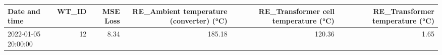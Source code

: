 \begin{tabular}{lrrrrr}
\toprule
Date and time & WT\_ID & MSE Loss & RE\_Ambient temperature (converter) (°C) & RE\_Transformer cell temperature (°C) & RE\_Transformer temperature (°C) \\
\midrule
2022-01-05 20:00:00 & 12 & 8.34 & 185.18 & 120.36 & 1.65 \\
\bottomrule
\end{tabular}
